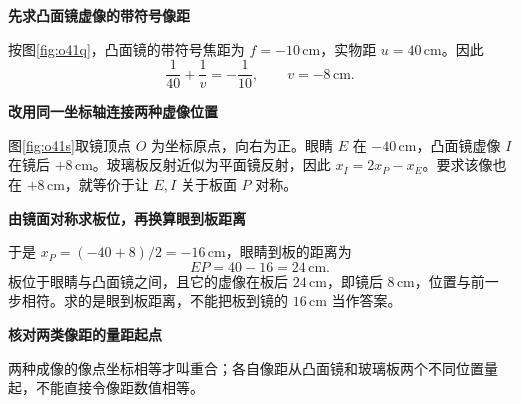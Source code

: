 \begin{solution}\textbf{先求凸面镜虚像的带符号像距}\par\nobreak
按图\ref{fig:o41q}，凸面镜的带符号焦距为 \(f=-10\,\mathrm{cm}\)，实物距 \(u=40\,\mathrm{cm}\)。因此
\[
 \frac1{40}+\frac1v=-\frac1{10},\qquad v=-8\,\mathrm{cm}.
\]


\par\medskip{}\noindent\textbf{改用同一坐标轴连接两种虚像位置}\par\nobreak
图\ref{fig:o41s}取镜顶点 \(O\) 为坐标原点，向右为正。眼睛 \(E\) 在 \(-40\,\mathrm{cm}\)，凸面镜虚像 \(I\) 在镜后 \(+8\,\mathrm{cm}\)。玻璃板反射近似为平面镜反射，因此 $x_I=2x_P-x_E$。要求该像也在 $+8\,\mathrm{cm}$，就等价于让 $E,I$ 关于板面 $P$ 对称。



\par\medskip{}\noindent\textbf{由镜面对称求板位，再换算眼到板距离}\par\nobreak
于是 \(x_P=(-40+8)/2=-16\,\mathrm{cm}\)，眼睛到板的距离为
\[
 \boxed{EP=40-16=24\,\mathrm{cm}}.
\]
板位于眼睛与凸面镜之间，且它的虚像在板后 \(24\,\mathrm{cm}\)，即镜后 \(8\,\mathrm{cm}\)，位置与前一步相符。求的是眼到板距离，不能把板到镜的 \(16\,\mathrm{cm}\) 当作答案。



\par\medskip{}\noindent\textbf{核对两类像距的量距起点}\par\nobreak
两种成像的像点坐标相等才叫重合；各自像距从凸面镜和玻璃板两个不同位置量起，不能直接令像距数值相等。
\end{solution}

